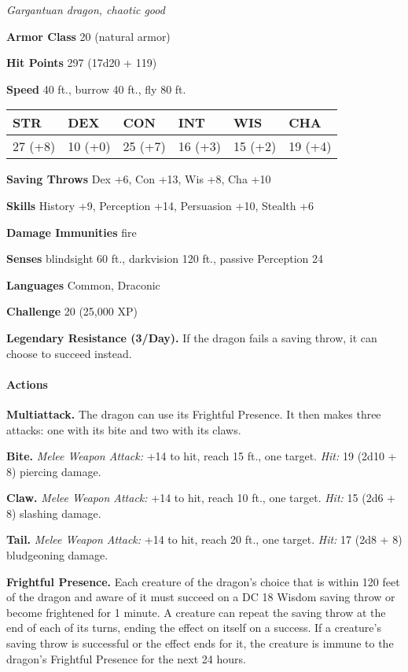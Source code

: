 \documentclass[
]{article}
\begin{document}
\emph{Gargantuan dragon, chaotic good}

\textbf{Armor Class} 20 (natural armor)

\textbf{Hit Points} 297 (17d20 + 119)

\textbf{Speed} 40 ft., burrow 40 ft., fly 80 ft.

\begin{longtable}[]{@{}llllll@{}}
\toprule
STR & DEX & CON & INT & WIS & CHA\tabularnewline
\midrule
\endhead
27 (+8) & 10 (+0) & 25 (+7) & 16 (+3) & 15 (+2) & 19 (+4)\tabularnewline
\bottomrule
\end{longtable}

\textbf{Saving Throws} Dex +6, Con +13, Wis +8, Cha +10

\textbf{Skills} History +9, Perception +14, Persuasion +10, Stealth +6

\textbf{Damage Immunities} fire

\textbf{Senses} blindsight 60 ft., darkvision 120 ft., passive
Perception 24

\textbf{Languages} Common, Draconic

\textbf{Challenge} 20 (25,000 XP)

\textbf{Legendary Resistance (3/Day).} If the dragon fails a saving
throw, it can choose to succeed instead.

\hypertarget{actions-43}{%
\paragraph{Actions}\label{actions-43}}

\textbf{Multiattack.} The dragon can use its Frightful Presence. It then
makes three attacks: one with its bite and two with its claws.

\textbf{Bite.} \emph{Melee Weapon Attack:} +14 to hit, reach 15 ft., one
target. \emph{Hit:} 19 (2d10 + 8) piercing damage.

\textbf{Claw.} \emph{Melee Weapon Attack:} +14 to hit, reach 10 ft., one
target. \emph{Hit:} 15 (2d6 + 8) slashing damage.

\textbf{Tail.} \emph{Melee Weapon Attack:} +14 to hit, reach 20 ft., one
target. \emph{Hit:} 17 (2d8 + 8) bludgeoning damage.

\textbf{Frightful Presence.} Each creature of the dragon's choice that
is within 120 feet of the dragon and aware of it must succeed on a DC 18
Wisdom saving throw or become frightened for 1 minute. A creature can
repeat the saving throw at the end of each of its turns, ending the
effect on itself on a success. If a creature's saving throw is
successful or the effect ends for it, the creature is immune to the
dragon's Frightful Presence for the next 24 hours.
\end{document}
